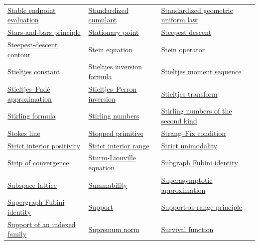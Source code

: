 \documentclass[11pt,oneside]{article}
\begin{document}
\begin{longtable}{L{0.31\textwidth}L{0.31\textwidth}L{0.31\textwidth}}
\hyperlink{gls:stable-endpoint-evaluation}{Stable endpoint evaluation} & \hyperlink{gls:standardized-cumulant}{Standardized cumulant} & \hyperlink{gls:standardized-geometric-uniform-law}{Standardized geometric uniform law} \\
\hyperlink{gls:stars-and-bars}{Stars-and-bars principle} & \hyperlink{gls:stationary-point}{Stationary point} & \hyperlink{gls:steepest-descent}{Steepest descent} \\
\hyperlink{gls:steepest-descent-contour}{Steepest-descent contour} & \hyperlink{gls:stein-equation}{Stein equation} & \hyperlink{gls:stein-operator}{Stein operator} \\
\hyperlink{gls:stieltjes-constant}{Stieltjes constant} & \hyperlink{gls:stieltjes-inversion-formula}{Stieltjes inversion formula} & \hyperlink{gls:stieltjes-moment-sequence}{Stieltjes moment sequence} \\
\hyperlink{gls:stieltjes-pade-approximation}{Stieltjes--Padé approximation} & \hyperlink{gls:stieltjes-perron-inversion}{Stieltjes--Perron inversion} & \hyperlink{gls:stieltjes-transform}{Stieltjes transform} \\
\hyperlink{gls:stirling-formula}{Stirling formula} & \hyperlink{gls:stirling-numbers}{Stirling numbers} & \hyperlink{gls:stirling-second-kind}{Stirling numbers of the second kind} \\
\hyperlink{gls:stokes-line}{Stokes line} & \hyperlink{gls:stopped-primitive}{Stopped primitive} & \hyperlink{gls:strang-fix-condition}{Strang--Fix condition} \\
\hyperlink{gls:strict-interior-positivity}{Strict interior positivity} & \hyperlink{gls:strict-interior-range}{Strict interior range} & \hyperlink{gls:strict-unimodality}{Strict unimodality} \\
\hyperlink{gls:strip-of-convergence}{Strip of convergence} & \hyperlink{gls:sturm-liouville-equation}{Sturm-Liouville equation} & \hyperlink{gls:subgraph-fubini-identity}{Subgraph Fubini identity} \\
\hyperlink{gls:subspace-lattice}{Subspace lattice} & \hyperlink{gls:summability}{Summability} & \hyperlink{gls:superasymptotic-approximation}{Superasymptotic approximation} \\
\hyperlink{gls:supergraph-fubini-identity}{Supergraph Fubini identity} & \hyperlink{gls:support}{Support} & \hyperlink{gls:support-as-range}{Support-as-range principle} \\
\hyperlink{gls:family-support}{Support of an indexed family} & \hyperlink{gls:supremum-norm}{Supremum norm} & \hyperlink{gls:survival-function}{Survival function} \\

\end{longtable}
\end{document}

